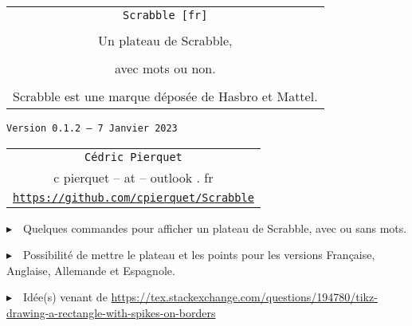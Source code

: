 \documentclass{article}
\def\TPversion{0.1.2}
\def\TPdate{7 Janvier 2023}
\begin{document}
\pagestyle{fancy}

\thispagestyle{empty}

\vspace{2cm}

\begin{center}
	\begin{minipage}{0.75\linewidth}
	\begin{tcolorbox}[colframe=yellow,colback=yellow!15]
		\begin{center}
			\begin{tabular}{c}
				{\Huge \texttt{Scrabble [fr]}}\\
				\\
				{\LARGE Un plateau de Scrabble,} \\
				\\
				{\LARGE avec mots ou non.} \\
				\\
				{Scrabble\texttrademark{} est une marque déposée de Hasbro\texttrademark{} et Mattel\texttrademark{}.}
			\end{tabular}
			
			\medskip
			
			{\small \texttt{Version \TPversion{} -- \TPdate}}
		\end{center}
	\end{tcolorbox}
\end{minipage}
\end{center}

\vspace{0.5cm}

\begin{center}
	\begin{tabular}{c}
	\texttt{Cédric Pierquet}\\
	{\ttfamily c pierquet -- at -- outlook . fr}\\
	\texttt{\url{https://github.com/cpierquet/Scrabble}}
\end{tabular}
\end{center}

\vspace{0.5cm}

{$\blacktriangleright$~~Quelques commandes pour afficher un plateau de Scrabble, avec ou sans mots.}

\smallskip

{$\blacktriangleright$~~Possibilité de mettre le plateau et les points pour les versions Française, Anglaise, Allemande et Espagnole.}

\smallskip

{$\blacktriangleright$~~Idée(s) venant de \url{https://tex.stackexchange.com/questions/194780/tikz-drawing-a-rectangle-with-spikes-on-borders}}
\end{document}
